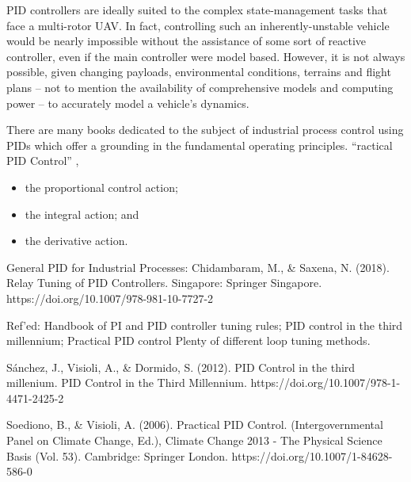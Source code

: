\documentclass[10pt]{article}
\begin{document}
PID controllers are ideally suited to the complex state-management tasks that face a multi-rotor UAV. In fact, controlling such an inherently-unstable vehicle would be nearly impossible without the assistance of some sort of reactive controller, even if the main controller were model based. However, it is not always possible, given changing payloads, environmental conditions, terrains and flight plans -- not to mention the availability of comprehensive models and computing power -- to accurately model a vehicle’s dynamics.

There are many books dedicated to the subject of industrial process control using PIDs which offer a grounding in the fundamental operating principles. ``ractical PID Control'' \cite{Soediono1989}, 

\begin{itemize}
\item the proportional control action;
\item the integral action; and
\item the derivative action.
\end{itemize}

General PID for Industrial Processes:
\cite{Saxena}
Chidambaram, M., \& Saxena, N. (2018). Relay Tuning of PID Controllers. Singapore: Springer Singapore. https://doi.org/10.1007/978-981-10-7727-2

Ref’ed: Handbook of PI and  PID controller tuning rules; PID control in the third millennium; Practical PID control
Plenty of different loop tuning methods.

\cite{Sanchez2012}
Sánchez, J., Visioli, A., \& Dormido, S. (2012). PID Control in the third millenium. PID Control in the Third Millennium. https://doi.org/10.1007/978-1-4471-2425-2

\cite{Soediono1989}
Soediono, B., \& Visioli, A. (2006). Practical PID Control. (Intergovernmental Panel on Climate Change, Ed.), Climate Change 2013 - The Physical Science Basis (Vol. 53). Cambridge: Springer London. https://doi.org/10.1007/1-84628-586-0


\newpage


\end{document}

